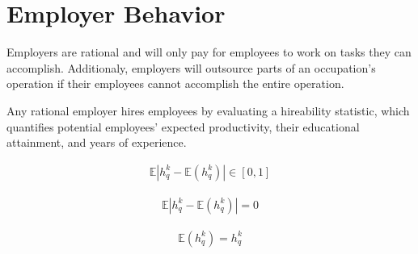 \documentclass[hidelinks, nonatbib]{elsarticle}
\begin{document}
\section{Employer Behavior}
\begin{axiom}
    \label{era}
    Employers are rational and will only pay for employees to work on tasks they can accomplish. Additionaly, employers will outsource parts of an occupation's operation if their employees cannot accomplish the entire operation.
\end{axiom}
\begin{axiom}
    \label{ha}
    Any rational employer hires employees by evaluating a hireability statistic, which quantifies potential employees' expected productivity, their educational attainment, and years of experience.

    \begin{subaxiom}
        \begin{gather}
            \mathbb{E}
                \left| 
                    h_{q}^{k} - 
                    \mathbb{E}(h_{q}^{k})
                \right| 
            \in [0,1]
        \end{gather}
    \end{subaxiom}
    
    \begin{subaxiom}
        \begin{gather}
            \mathbb{E}
                \left| 
                    h_{q}^{k} - 
                    \mathbb{E}(h_{q}^{k})
                \right| 
            = 0
        \end{gather}
    \end{subaxiom}
    
    \begin{subaxiom}
        \begin{gather}
            \mathbb{E}(h_{q}^{k}) = h_{q}^{k}
        \end{gather}
    \end{subaxiom}
\end{axiom}
\end{document}
